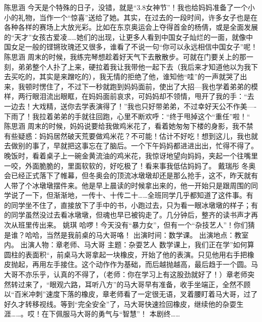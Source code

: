 {}陈思涵\markdownRendererInterblockSeparator
{}今天是个特殊的日子，没错，就是“3.8女神节”！我也给妈妈准备了一个小小的礼物，当作一个“惊喜”送给了她。其实，在过去的一段时间，许多女子也是在各种各样的赛场上大放光彩。比如在东京奥运会上夺得首金的杨倩，或是全面发展的“天才”女孩古爱凌……她们的出现，让更多人看到中国女子灿烂的一面，就像中国女足一般的铿锵玫瑰还又很多，谁看了不说一句“你可以永远相信中国女子”呢！\markdownRendererInterblockSeparator
{}\markdownRendererInterblockSeparator
{}陈思涵\markdownRendererInterblockSeparator
{}周末的时候，我练完琴想趁着好天气下去散散步。可就在门要关上的那一刻，弟弟整个人扑了上来，硬拉着我让我带他一起下去（我后来才知道他以为我下去买吃的，其实是来蹭吃的），我无情的拒绝了他，谁知他“哇”的一声就哭了出来，我顿时愣住了，不过下一秒就跑到妈妈面前，使出了大招—我也学着弟弟的模样，两行眼泪流出眼眶，在妈妈面前哀求，可妈妈却不领情，甩开了我的手：“去一边去！大戏精，送你去学表演得了！”我也只好带弟弟，不过幸好天公不作美—-下雨了！我拉着弟弟的手就往回跑，心里不断欢呼：“终于甩掉这个“重任”啦！“\markdownRendererInterblockSeparator
{}\markdownRendererInterblockSeparator
{}陈思涵\markdownRendererInterblockSeparator
{}周末的时候，妈妈说要给我做鸡米花了，看着她匆匆下楼的身影，我不禁有些疑惑：妈妈居然破天荒要做鸡米花？不可能！估计不好吃！想到这儿，我也就去做别的事了，早就把这事忘在了脑后。一个下午妈妈都进进出出，忙得不得了。晚饭时，看着桌子上一碗金黄流油的鸡米花，我惊讶地望向妈妈，夹起一个往嘴里一咬，外面脆脆的，里面软软的，好吃极了！看来事我低估妈妈了。\markdownRendererInterblockSeparator
{}\markdownRendererInterblockSeparator
{}戴瑞彤\markdownRendererInterblockSeparator
{}冬奥会已经正式落下了帷幕，但冬奥会的顶流冰墩墩却还是那么抢手，这不，昨天就有人带了个冰墩墩摆件来。他是早上晨读的时候拿出来的，他一开始只是跟周围的同学说了一下，但渐渐地，一传十、十传二十……全班同学几乎都知道了这件事。有的同学坐不住了，直接放下了手中的书，小跑过去，只为看一眼冰墩墩的样子；有的同学虽然没过去看冰墩墩，但魂也早已被钩走了。几分钟后，整齐的读书声才再次从班里传出来。\markdownRendererInterblockSeparator
{}\markdownRendererInterblockSeparator
{}姚琪\markdownRendererInterblockSeparator
{}哈啰！今天没有“暴力女”，但有一个“杂技艺人”！你们猜是谁？哈哈，当然是我前桌的马大哥咯！\markdownRendererInterblockSeparator
{}出演时间：数学课。 出演地点：教室内。\markdownRendererInterblockSeparator
{}出演人物：章老师、马大哥 主题：杂耍艺人\markdownRendererInterblockSeparator
{}数学课上，我们正在学”如何算圆柱的表面积“，前桌马大哥拿起一块橡皮，开始了他的表演。只见他用右手把橡皮抛起，再用左手接住。这个动作作为基础，而后越抛越高，最后趋于一个圆。马大哥不亦乐乎，认真的不得了，（老师：你在学习上有这股劲就好了！）章老师突然转过来了，“眼观六路，耳听八方”的马大哥早有准备，收手坐端正，全然不顾以“百米冲刺”速度下落的橡皮，章老师看了一定很无语，叉着腰盯着马大哥，过了好久才转移视线。等到“完全安全”了，马大哥快速捡回橡皮，继续他的杂耍生涯……。哎！在下佩服马大哥的勇气与“智慧”！ 本剧终……\markdownRendererInterblockSeparator

